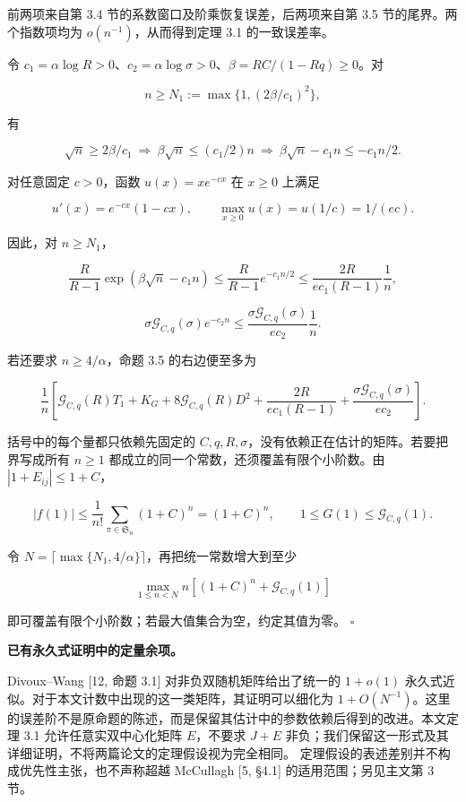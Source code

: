 \documentclass[11pt,a4paper]{article}
\begin{document}
前两项来自第 3.4 节的系数窗口及阶乘恢复误差，后两项来自第 3.5 节的尾界。两个指数项均为 \(o(n^{-1})\)，从而得到定理 3.1 的一致误差率。

令 \(c_1=\alpha\log R>0\)、\(c_2=\alpha\log\sigma>0\)、\(\beta=RC/(1-Rq)\ge0\)。对

\[
n\ge N_1:=\max\{1,(2\beta/c_1)^2\},
\]

有

\[
\sqrt n\ge2\beta/c_1
\ \Longrightarrow\ {}
\beta\sqrt n\le(c_1/2)n
\ \Longrightarrow\ {}
\beta\sqrt n-c_1n\le-c_1n/2.
\]

对任意固定 \(c>0\)，函数 \(u(x)=xe^{-cx}\) 在 \(x\ge0\) 上满足

\[
u'(x)=e^{-cx}(1-cx),\qquad
\max_{x\ge0}u(x)=u(1/c)=1/(ec).
\]

因此，对 \(n\ge N_1\)，

\[
\frac R{R-1}\exp(\beta\sqrt n-c_1n)
\le\frac R{R-1}e^{-c_1n/2}
\le\frac{2R}{ec_1(R-1)}\frac1n,
\]

\[
\sigma\mathcal G_{C,q}(\sigma)e^{-c_2n}
\le\frac{\sigma\mathcal G_{C,q}(\sigma)}{ec_2}\frac1n.
\]

若还要求 \(n\ge4/\alpha\)，命题 3.5 的右边便至多为

\[
\frac1n\left[
\mathcal G_{C,q}(R)T_1+K_G+8\mathcal G_{C,q}(R)D^2
+\frac{2R}{ec_1(R-1)}
+\frac{\sigma\mathcal G_{C,q}(\sigma)}{ec_2}\right].
\]

括号中的每个量都只依赖先固定的 \(C,q,R,\sigma\)，没有依赖正在估计的矩阵。若要把界写成所有 \(n\ge1\) 都成立的同一个常数，还须覆盖有限个小阶数。由 \(|1+E_{ij}|\le1+C\)，

\[
|f(1)|\le\frac1{n!}\sum_{\pi\in \mathfrak S_n}(1+C)^n=(1+C)^n,
\qquad 1\le G(1)\le\mathcal G_{C,q}(1).
\]

令 \(N=\lceil\max\{N_1,4/\alpha\}\rceil\)，再把统一常数增大到至少

\[
\max_{1\le n<N}n\left[(1+C)^n+\mathcal G_{C,q}(1)\right]
\]

即可覆盖有限个小阶数；若最大值集合为空，约定其值为零。 \(\square\)

\textbf{已有永久式证明中的定量余项。}

Divoux--Wang {[}12, 命题 3.1{]} 对非负双随机矩阵给出了统一的 \(1+o(1)\) 永久式近似。对于本文计数中出现的这一类矩阵，其证明可以细化为 \(1+O(N^{-1})\)。这里的误差阶不是原命题的陈述，而是保留其估计中的参数依赖后得到的改进。本文定理 3.1 允许任意实双中心化矩阵 \(E\)，不要求 \(J+E\) 非负；我们保留这一形式及其详细证明，不将两篇论文的定理假设视为完全相同。 定理假设的表述差别并不构成优先性主张，也不声称超越 McCullagh {[}5, §4.1{]} 的适用范围；另见主文第 3 节。
\end{document}
